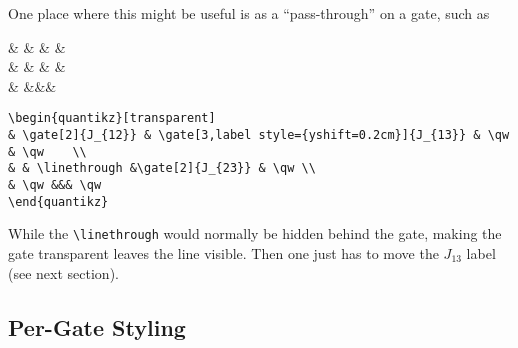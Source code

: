 \documentclass[aps,pra,10pt,nofootinbib]{revtex4}
\begin{document}
One place where this might be useful is as a ``pass-through'' on a gate, such as 
\begin{Code}
\begin{center}
\begin{quantikz}[transparent]
&  &  & \qw & \qw	\\
& & \linethrough & & \qw \\
& \qw &&& \qw
\end{quantikz}
\end{center}
\tcblower
\begin{lstlisting}
\begin{quantikz}[transparent]
& \gate[2]{J_{12}} & \gate[3,label style={yshift=0.2cm}]{J_{13}} & \qw & \qw	\\
& & \linethrough &\gate[2]{J_{23}} & \qw \\
& \qw &&& \qw
\end{quantikz}
\end{lstlisting}
\end{Code}
While the \verb!\linethrough! would normally be hidden behind the gate, making the gate transparent leaves the line visible. Then one just has to move the $J_{13}$ label (see next section).

\subsection{Per-Gate Styling}
\end{document}
